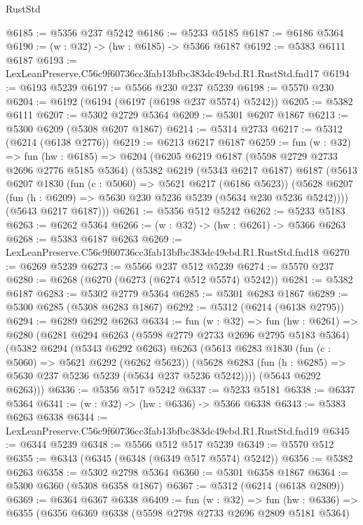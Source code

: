 \begin{lexlean}{RustStd}
\begin{coremodule}
@6185 := @5356 @237 @5242
@6186 := @5233 @5185
@6187 := @6186 @5364
@6190 := (w : @32) -> (hw : @6185) -> @5366 @6187
@6192 := @5383 @6111 @6187
@6193 := LexLeanPreserve.C56c9f60736cc3fab13bfbc383dc49ebd.R1.RustStd.fnd17
@6194 := @6193 @5239
@6197 := @5566 @230 @237 @5239
@6198 := @5570 @230
@6204 := @6192 (@6194 (@6197 (@6198 @237 @5574) @5242))
@6205 := @5382 @6111
@6207 := @5302 @2729 @5364
@6209 := @5301 @6207 @1867
@6213 := @5300 @6209 (@5308 @6207 @1867)
@6214 := @5314 @2733
@6217 := @5312 (@6214 (@6138 @2776))
@6219 := @6213 @6217 @6187
@6259 := fun (w : @32) =>
  fun (hw : @6185) =>
  @6204
    (@6205
      @6219
      @6187
      (@5598 @2729 @2733 @2696 @2776 @5185 @5364)
      (@5382
        @6219
        (@5343 @6217 @6187)
        @6187
        (@5613
          @6207
          @1830
          (fun (c : @5060) => @5621 @6217 (@6186 @5623))
          (@5628 @6207 (fun (h : @6209) => @5630 @230 @5236 @5239 (@5634 @230 @5236 @5242))))
        (@5643 @6217 @6187)))
@6261 := @5356 @512 @5242
@6262 := @5233 @5183
@6263 := @6262 @5364
@6266 := (w : @32) -> (hw : @6261) -> @5366 @6263
@6268 := @5383 @6187 @6263
@6269 := LexLeanPreserve.C56c9f60736cc3fab13bfbc383dc49ebd.R1.RustStd.fnd18
@6270 := @6269 @5239
@6273 := @5566 @237 @512 @5239
@6274 := @5570 @237
@6280 := @6268 (@6270 (@6273 (@6274 @512 @5574) @5242))
@6281 := @5382 @6187
@6283 := @5302 @2779 @5364
@6285 := @5301 @6283 @1867
@6289 := @5300 @6285 (@5308 @6283 @1867)
@6292 := @5312 (@6214 (@6138 @2795))
@6294 := @6289 @6292 @6263
@6334 := fun (w : @32) =>
  fun (hw : @6261) =>
  @6280
    (@6281
      @6294
      @6263
      (@5598 @2779 @2733 @2696 @2795 @5183 @5364)
      (@5382
        @6294
        (@5343 @6292 @6263)
        @6263
        (@5613
          @6283
          @1830
          (fun (c : @5060) => @5621 @6292 (@6262 @5623))
          (@5628 @6283 (fun (h : @6285) => @5630 @237 @5236 @5239 (@5634 @237 @5236 @5242))))
        (@5643 @6292 @6263)))
@6336 := @5356 @517 @5242
@6337 := @5233 @5181
@6338 := @6337 @5364
@6341 := (w : @32) -> (hw : @6336) -> @5366 @6338
@6343 := @5383 @6263 @6338
@6344 := LexLeanPreserve.C56c9f60736cc3fab13bfbc383dc49ebd.R1.RustStd.fnd19
@6345 := @6344 @5239
@6348 := @5566 @512 @517 @5239
@6349 := @5570 @512
@6355 := @6343 (@6345 (@6348 (@6349 @517 @5574) @5242))
@6356 := @5382 @6263
@6358 := @5302 @2798 @5364
@6360 := @5301 @6358 @1867
@6364 := @5300 @6360 (@5308 @6358 @1867)
@6367 := @5312 (@6214 (@6138 @2809))
@6369 := @6364 @6367 @6338
@6409 := fun (w : @32) =>
  fun (hw : @6336) =>
  @6355
    (@6356
      @6369
      @6338
      (@5598 @2798 @2733 @2696 @2809 @5181 @5364)

\end{coremodule}
\end{lexlean}
